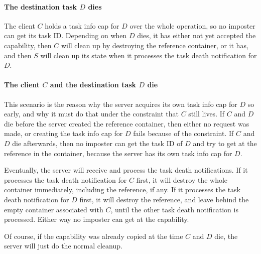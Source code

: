 \paragraph{The destination task $D$ dies}

The client $C$ holds a task info cap for $D$ over the whole operation,
so no imposter can get its task ID.  Depending on when $D$ dies, it
has either not yet accepted the capability, then $C$ will clean up by
destroying the reference container, or it has, and then $S$ will clean
up its state when it processes the task death notification for $D$.

\paragraph{The client $C$ and the destination task $D$ die}

This scenario is the reason why the server acquires its own task info
cap for $D$ so early, and why it must do that under the constraint
that $C$ still lives.  If $C$ and $D$ die before the server created
the reference container, then either no request was made, or creating
the task info cap for $D$ fails because of the constraint.  If $C$ and
$D$ die afterwards, then no imposter can get the task ID of $D$ and
try to get at the reference in the container, because the server has
its own task info cap for $D$.

\begin{comment}
  This problem was identified very late in the development of this
  protocol.  We just did not think of both clients dieing at the same
  time!  In an earlier version of the protocol, the server would
  acquire its task info cap when $D$ accepts its reference.  This is
  too late: If $C$ and $D$ die just before that, an imposter with
  $D$'s task ID can try to get the reference in the container before
  the server processes the task death notification for $C$ and
  destroys it.
\end{comment}

Eventually, the server will receive and process the task death
notifications.  If it processes the task death notification for $C$
first, it will destroy the whole container immediately, including the
reference, if any.  If it processes the task death notification for
$D$ first, it will destroy the reference, and leave behind the empty
container associated with $C$, until the other task death notification
is processed.  Either way no imposter can get at the capability.

Of course, if the capability was already copied at the time $C$ and
$D$ die, the server will just do the normal cleanup.

